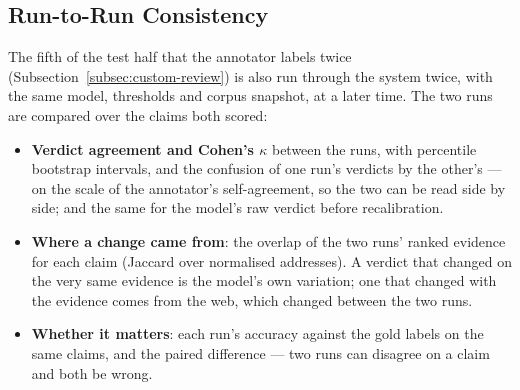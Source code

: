 \subsection{Run-to-Run Consistency}
\label{subsec:consistency}

The fifth of the test half that the annotator labels twice
(Subsection~\ref{subsec:custom-review}) is also run through the system
twice, with the same model, thresholds and corpus snapshot, at a later
time. The two runs are compared over the claims both scored:

\begin{itemize}
    \item \textbf{Verdict agreement and Cohen's $\kappa$} between the
    runs, with percentile bootstrap intervals, and the confusion of one
    run's verdicts by the other's --- on the scale of the annotator's
    self-agreement, so the two can be read side by side; and the same
    for the model's raw verdict before recalibration.
    \item \textbf{Where a change came from}: the overlap of the two
    runs' ranked evidence for each claim (Jaccard over normalised
    addresses). A verdict that changed on the very same evidence is the
    model's own variation; one that changed with the evidence comes from
    the web, which changed between the two runs.
    \item \textbf{Whether it matters}: each run's accuracy against the
    gold labels on the same claims, and the paired difference --- two
    runs can disagree on a claim and both be wrong.
\end{itemize}
